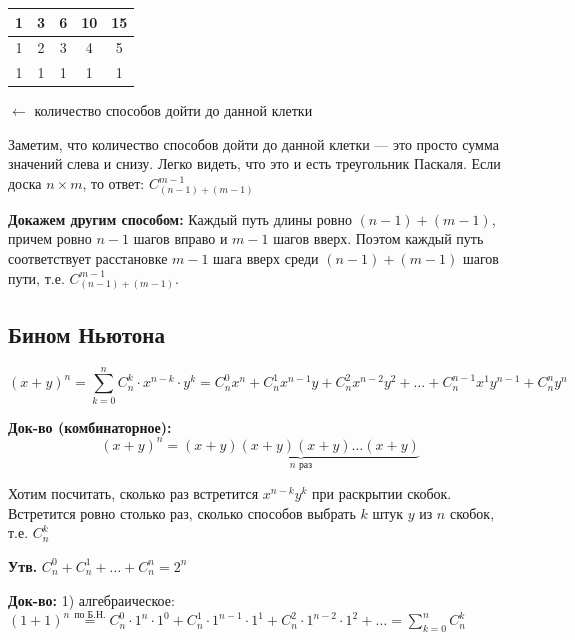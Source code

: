 \documentclass[10pt, a4paper]{article}
\begin{document}
\vspace{0.3cm}
\noindent
\begin{minipage}[c]{0.3\textwidth}
    \begin{tabular}{|c|c|c|c|c|}
    \hline
    1 & 3 & 6 & 10 & 15 \\ \hline
    1 & 2 & 3 & 4 & 5 \\ \hline
    1 & 1 & 1 & 1 & 1 \\ \hline
    \end{tabular}
\end{minipage}
\begin{minipage}[c]{0.6\textwidth}
    $\leftarrow$ количество способов дойти до данной клетки
\end{minipage}

\vspace{0.3cm}
\noindent Заметим, что количество способов дойти до данной клетки --- это просто сумма значений слева и снизу. Легко видеть, что это и есть треугольник Паскаля. Если доска $n \times m$, то ответ: $C_{(n-1)+(m-1)}^{m-1}$

\vspace{0.2cm}
\noindent \textbf{Докажем другим способом:}
Каждый путь длины ровно $(n-1) + (m-1)$, причем ровно $n-1$ шагов вправо и $m-1$ шагов вверх. Поэтом каждый путь соответствует расстановке $m-1$ шага вверх среди $(n-1) + (m-1)$ шагов пути, т.е. $C_{(n-1)+(m-1)}^{m-1}$.

\subsection*{Бином Ньютона}

$$(x+y)^n = \sum_{k=0}^{n} C_n^k \cdot x^{n-k} \cdot y^k = C_n^0 x^n + C_n^1 x^{n-1} y + C_n^2 x^{n-2} y^2 + \dots + C_n^{n-1} x^1 y^{n-1} + C_n^n y^n$$

\vspace{0.2cm}
\noindent \textbf{Док-во (комбинаторное):} 
$$(x+y)^n = \underbrace{(x+y)(x+y)(x+y)\dots(x+y)}_{n \text{ раз}}$$

\noindent Хотим посчитать, сколько раз встретится $x^{n-k} y^k$ при раскрытии скобок.
Встретится ровно столько раз, сколько способов выбрать $k$ штук $y$ из $n$ скобок, т.е. $C_n^k$

\vspace{0.3cm}
\noindent \textbf{Утв.} $C_n^0 + C_n^1 + \dots + C_n^n = 2^n$

\vspace{0.2cm}
\noindent \textbf{Док-во:} 
1) алгебраическое:
$(1+1)^n \stackrel{\text{по Б.Н.}}{=} C_n^0 \cdot 1^n \cdot 1^0 + C_n^1 \cdot 1^{n-1} \cdot 1^1 + C_n^2 \cdot 1^{n-2} \cdot 1^2 + \dots = \sum_{k=0}^{n} C_n^k \quad$
\end{document}
